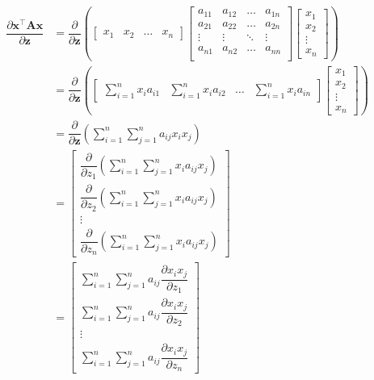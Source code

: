 \documentclass{article}
\newcommand{\trans}{\top}
\begin{document}
\begin{align}
    \dfrac{\partial \mathbf{x}^\trans \mathbf{A} \mathbf{x}}{\partial \mathbf{z}} &= \dfrac{\partial}{\partial \mathbf{z}} \left(
    \begin{bmatrix}
        x_{1} & x_{2} & \dots & x_{n}
    \end{bmatrix}
    \begin{bmatrix}
        a_{11} & a_{12} & \dots & a_{1n} \\
        a_{21} & a_{22} & \dots & a_{2n} \\
        \vdots & \vdots & \ddots & \vdots \\
        a_{n1} & a_{n2} & \dots & a_{nn} \\
    \end{bmatrix} \begin{bmatrix}
        x_{1} \\ x_{2} \\ \vdots \\ x_{n}
    \end{bmatrix} \right) \\
    &= \dfrac{\partial}{\partial \mathbf{z}} \left(
			\begin{bmatrix}
				\displaystyle \sum_{i = 1}^{n} x_{i}a_{i1} & 
				\displaystyle \sum_{i = 1}^{n} x_{i}a_{i2} & 
				\dots & 
				\displaystyle \sum_{i = 1}^{n} x_{i}a_{in}
			\end{bmatrix} \begin{bmatrix}
				x_{1} \\ x_{2} \\ \vdots \\ x_{n}
			\end{bmatrix} \right) \\
            &= \dfrac{\partial}{\partial \mathbf{z}} \left(
				\sum_{i = 1}^{n}\sum_{j = 1}^{n} a_{ij} x_{i} x_{j}
			\right) \\
    &= \begin{bmatrix}
        \displaystyle \dfrac{\partial}{\partial z_1} \left( \sum_{i = 1}^{n}\sum_{j = 1}^{n} x_{i} a_{ij} x_{j} \right) \\ 
        \displaystyle  \dfrac{\partial}{\partial z_2} \left( \sum_{i = 1}^{n}\sum_{j = 1}^{n} x_{i} a_{ij} x_{j} \right) \\ 
        \vdots \\ 
        \displaystyle \dfrac{\partial}{\partial z_n} \left( \sum_{i = 1}^{n}\sum_{j = 1}^{n} x_{i} a_{ij} x_{j} \right) 
    \end{bmatrix} \\
    &= \begin{bmatrix}
        \displaystyle \sum_{i = 1}^{n}\sum_{j = 1}^{n} a_{ij} \dfrac{\partial x_{i}x_{j}}{\partial z_1} \\ 
        \displaystyle \sum_{i = 1}^{n}\sum_{j = 1}^{n} a_{ij} \dfrac{\partial x_{i}x_{j}}{\partial z_2} \\ 
        \vdots \\ 
        \displaystyle \sum_{i = 1}^{n}\sum_{j = 1}^{n} a_{ij} \dfrac{\partial x_{i}x_{j}}{\partial z_n} 
    \end{bmatrix}
\end{align}
\end{document}
